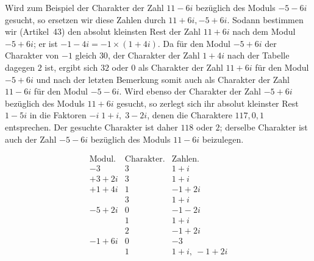 Wird zum Beispiel der Charakter der Zahl $11-6i$ bezüglich des Moduls $-5-6i$ gesucht, so ersetzen wir diese Zahlen durch $11+6i,-5+6i$. Sodann bestimmen wir (Artikel~43) den absolut kleinsten Rest der Zahl $11+6i$ nach dem Modul $-5+6i$; er ist $-1-4i=-1\times(1+4i)$. Da für den Modul $-5+6i$ der Charakter von $-1$ gleich $30$, der Charakter der Zahl $1+4i$ nach der Tabelle dagegen $2$ ist, ergibt sich $32$ oder $0$ als Charakter der Zahl $11+6i$ für den Modul $-5+6i$ und nach der letzten Bemerkung somit auch als Charakter der Zahl $11-6i$ für den Modul $-5-6i$. Wird ebenso der Charakter der Zahl $-5+6i$ bezüglich des Moduls $11+6i$ gesucht, so zerlegt sich ihr absolut kleinster Rest $1-5i$ in die Faktoren $-i\;1+i,\;3-2i$, denen die Charaktere $117,0,1$ entsprechen. Der gesuchte Charakter ist daher $118$ oder $2$; derselbe Charakter ist auch der Zahl $-5-6i$ bezüglich des Moduls $11-6i$ beizulegen.

\[
\begin{array}{r|c|l}
\text{Modul.}&\text{Charakter.}&\text{Zahlen.}\\\hline
-3&3&1+i\\
+3+2i&3&1+i\\
+1+4i&1&-1+2i\\
&3&1+i\\
-5+2i&0&-1-2i\\
&1&1+i\\
&2&-1+2i\\
-1+6i&0&-3\\
&1&1+i,\ -1+2i
\end{array}
\]

